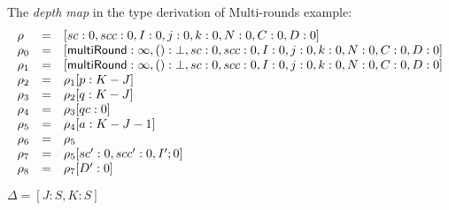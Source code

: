 The \emph{depth map} in the type derivation of Multi-rounds example:
\[
\begin{array}{lll}
\rho     & = & [sc : 0, scc : 0, I : 0, j : 0, k : 0, N : 0, C: 0, D : 0] \\
\rho_0   & = & [\mathsf{multiRound}: \infty, () : \bot, sc : 0, scc : 0, I : 0, j : 0, k : 0, N : 0, C: 0, D : 0] \\
\rho_1   & = & [\mathsf{multiRound}: \infty, () : \bot, sc : 0, scc : 0, I : 0, j : 0, k : 0, N : 0, C: 0, D : 0] \\
\rho_2   & = & \rho_1[p : K - J]\\
\rho_3   & = & \rho_2[q : K - J]\\
\rho_4   & = & \rho_3[qc : 0]\\
\rho_5   & = & \rho_4[a : K - J - 1]\\
\rho_6   & = & \rho_5\\
\rho_7   & = & \rho_5[sc' : 0, scc' : 0, I' ; 0]\\
\rho_8   & = & \rho_7[D' : 0]\\
\end{array}
\]

$\Delta = [J : S, K : S]$




